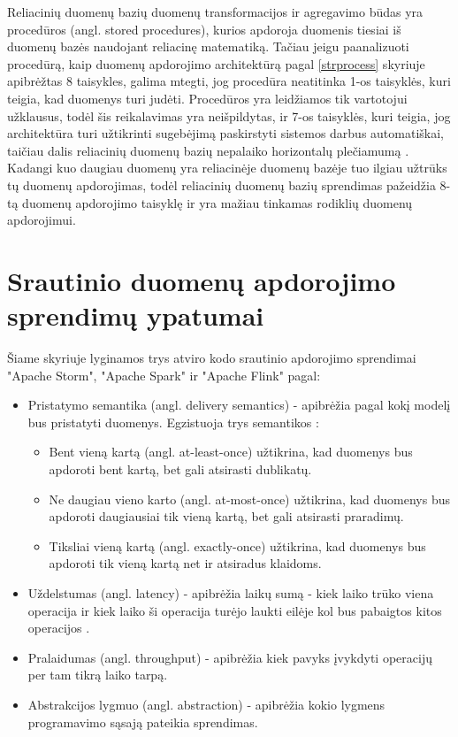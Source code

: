 \documentclass{VUMIFPSkursinis}
\begin{document}
        Reliacinių duomenų bazių duomenų transformacijos ir agregavimo būdas yra procedūros (angl. stored procedures), kurios apdoroja duomenis tiesiai iš duomenų bazės 
    naudojant reliacinę matematiką. Tačiau jeigu paanalizuoti procedūrą, kaip duomenų apdorojimo architektūrą pagal \ref{strprocess} skyriuje apibrėžtas 8 taisykles, 
    galima mtegti, jog procedūra neatitinka 1-os taisyklės, kuri teigia, kad duomenys turi judėti. Procedūros yra leidžiamos tik vartotojui užklausus, todėl šis reikalavimas yra neišpildytas, 
    ir 7-os taisyklės, kuri teigia, jog architektūra turi užtikrinti sugebėjimą paskirstyti sistemos darbus automatiškai, taičiau dalis reliacinių duomenų bazių nepalaiko horizontalų 
    plečiamumą \cite{cattelsql, jkubas}. Kadangi kuo daugiau duomenų yra reliacinėje duomenų bazėje 
    tuo ilgiau užtrūks tų duomenų apdorojimas, todėl reliacinių duomenų bazių sprendimas pažeidžia 8-tą duomenų 
    apdorojimo taisyklę ir yra mažiau tinkamas rodiklių duomenų apdorojimui.


\section{Srautinio duomenų apdorojimo sprendimų ypatumai} \label{srautarch}
Šiame skyriuje lyginamos trys atviro kodo srautinio apdorojimo sprendimai "Apache Storm", "Apache Spark" ir "Apache Flink" pagal:
\begin{itemize}
    \item Pristatymo semantika (angl. delivery semantics) - apibrėžia pagal kokį modelį bus pristatyti duomenys. Egzistuoja trys semantikos \cite{ensar20}: 
    \begin{itemize}
        \item Bent vieną kartą (angl. at-least-once) užtikrina, kad duomenys bus apdoroti bent kartą, bet gali atsirasti dublikatų. 
        \item Ne daugiau vieno karto (angl. at-most-once) užtikrina, kad duomenys bus apdoroti daugiausiai tik vieną kartą, bet gali atsirasti praradimų. 
        \item Tiksliai vieną kartą (angl. exactly-once) užtikrina, kad duomenys bus apdoroti tik vieną kartą net ir atsiradus klaidoms.
    \end{itemize}
    \item Uždelstumas (angl. latency) - apibrėžia laikų sumą - kiek laiko trūko viena operacija ir kiek laiko ši operacija turėjo laukti eilėje
    kol bus pabaigtos kitos operacijos \cite{karimov2018benchmarking}.
    \item Pralaidumas (angl. throughput) - apibrėžia kiek pavyks įvykdyti operacijų per tam tikrą laiko tarpą.
    \item Abstrakcijos lygmuo (angl. abstraction) - apibrėžia kokio lygmens programavimo sąsają pateikia sprendimas.
\end{itemize}
\end{document}
